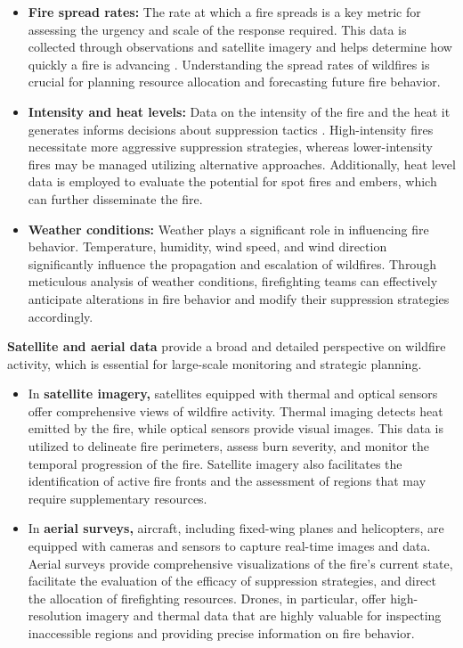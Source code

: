 \documentclass[
  12 pt,
]{Nemilov}
\begin{document}
\begin{itemize}
\item
  \textbf{Fire spread rates:} The rate at which a fire spreads is a key metric for assessing the urgency and scale of the response required. This data is collected through observations and satellite imagery and helps determine how quickly a fire is advancing \citep{monedero2019predicting, pereira2022review, perrakis2014modeling}. Understanding the spread rates of wildfires is crucial for planning resource allocation and forecasting future fire behavior.
\item
  \textbf{Intensity and heat levels:} Data on the intensity of the fire and the heat it generates informs decisions about suppression tactics \citep{liu2010trends}. High-intensity fires necessitate more aggressive suppression strategies, whereas lower-intensity fires may be managed utilizing alternative approaches. Additionally, heat level data is employed to evaluate the potential for spot fires and embers, which can further disseminate the fire.
\item
  \textbf{Weather conditions:} Weather plays a significant role in influencing fire behavior. Temperature, humidity, wind speed, and wind direction significantly influence the propagation and escalation of wildfires. Through meticulous analysis of weather conditions, firefighting teams can effectively anticipate alterations in fire behavior and modify their suppression strategies accordingly.
\end{itemize}

\textbf{Satellite and aerial data} provide a broad and detailed perspective on wildfire activity, which is essential for large-scale monitoring and strategic planning.

\begin{itemize}
\item
  In \textbf{satellite imagery,} satellites equipped with thermal and optical sensors offer comprehensive views of wildfire activity. Thermal imaging detects heat emitted by the fire, while optical sensors provide visual images. This data is utilized to delineate fire perimeters, assess burn severity, and monitor the temporal progression of the fire. Satellite imagery also facilitates the identification of active fire fronts and the assessment of regions that may require supplementary resources.
\item
  In \textbf{aerial surveys,} aircraft, including fixed-wing planes and helicopters, are equipped with cameras and sensors to capture real-time images and data. Aerial surveys provide comprehensive visualizations of the fire's current state, facilitate the evaluation of the efficacy of suppression strategies, and direct the allocation of firefighting resources. Drones, in particular, offer high-resolution imagery and thermal data that are highly valuable for inspecting inaccessible regions and providing precise information on fire behavior.
\end{itemize}
\end{document}
